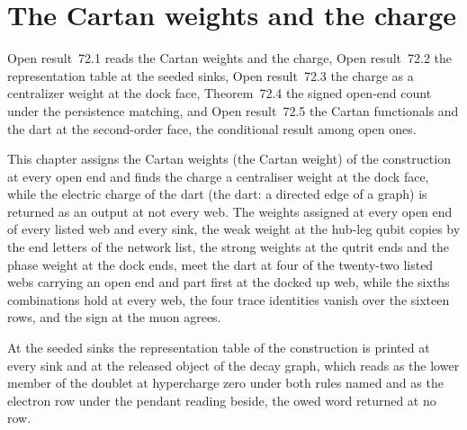 \section{The Cartan weights and the charge}\label{mod:IV-4-cartan-weights-and-the-charge}
\label{narr:open:4-4}Open result~72.1 reads the Cartan weights and the charge, Open result~72.2 the representation table at the seeded sinks, Open result~72.3 the charge as a centralizer weight at the dock face, Theorem~72.4 the signed open-end count under the persistence matching, and Open result~72.5 the Cartan functionals and the dart at the second-order face, the conditional result among open ones.
\begin{chwall}\label{box:IV-4-cartan-weights-and-the-charge:1}
This chapter assigns the Cartan weights (the Cartan weight) of the construction at every open end and finds the charge a centraliser weight at the dock face, while the electric charge of the dart (the dart: a directed edge of a graph) is returned as an output at not every web. The weights assigned at every open end of every listed web and every sink, the weak weight at the hub-leg qubit copies by the end letters of the network list, the strong weights at the qutrit ends and the phase weight at the dock ends, meet the dart at four of the twenty-two listed webs carrying an open end and part first at the docked up web, while the sixths combinations hold at every web, the four trace identities vanish over the sixteen rows, and the sign at the muon agrees.
\end{chwall}
\begin{chwall}\label{box:IV-4-cartan-weights-and-the-charge:2}
At the seeded sinks the representation table of the construction is printed at every sink and at the released object of the decay graph, which reads as the lower member of the doublet at hypercharge zero under both rules named and as the electron row under the pendant reading beside, the owed word returned at no row.
\end{chwall}
